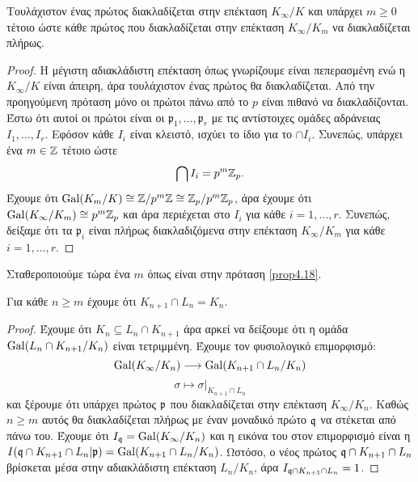 \begin{prop} \label{prop4.18}
    Τουλάχιστον ένας πρώτος διακλαδίζεται στην επέκταση $K_\infty/K$ και υπάρχει $m\geq 0$ τέτοιο ώστε κάθε πρώτος που διακλαδίζεται στην επέκταση $K_\infty/K_m$ να διακλαδίζεται πλήρως.
\end{prop}
\begin{proof}
    Η μέγιστη αδιακλάδιστη επέκταση όπως γνωρίζουμε είναι πεπερασμένη ενώ η $K_\infty/K$ είναι άπειρη, άρα τουλάχιστον ένας πρώτος θα διακλαδίζεται. Από την προηγούμενη πρόταση μόνο οι πρώτοι πάνω από το $p$ είναι πιθανό να διακλαδίζονται. Έστω ότι αυτοί οι πρώτοι είναι οι $\mathfrak{p}_1,\ldots, \mathfrak{p}_r$ με τις αντίστοιχες ομάδες αδράνειας $I_1,\ldots,I_r$. Εφόσον κάθε $I_i$ είναι κλειστό, ισχύει το ίδιο για το $\cap I_i$. Συνεπώς, υπάρχει ένα $m\in \mathbb{Z}$ τέτοιο ώστε 
    $$\bigcap I_i = p^m \mathbb{Z}_p .$$
    Έχουμε ότι $\operatorname{Gal}(K_m/K)\cong \mathbb{Z}/p^m \mathbb{Z} \cong \mathbb{Z}_p/p^m \mathbb{Z}_p$, άρα έχουμε ότι $\operatorname{Gal}(K_\infty/K_m) \cong p^m \mathbb{Z}_p$ και άρα περιέχεται στο $I_i$ για κάθε $i=1,\ldots,r$. Συνεπώς, δείξαμε ότι τα $\mathfrak{p}_i$ είναι πλήρως διακλαδιζόμενα στην επέκταση $K_\infty/K_m$ για κάθε $i=1,\ldots,r$. 
    
\end{proof}

    \noindent Σταθεροποιούμε τώρα ένα $m$ όπως είναι στην πρόταση \ref{prop4.18}.

    \begin{prop}
        Για κάθε $n\geq m$ έχουμε ότι $K_{n+1}\cap L_n = K_n$.
    \end{prop}

    \begin{proof}
                Έχουμε ότι $K_n \subseteq L_n \cap K_{n+1}$ άρα αρκεί να δείξουμε ότι η ομάδα $\operatorname{Gal}(L_n \cap K_{n+1} / K_n)$ είναι τετριμμένη. Έχουμε τον φυσιολογικό επιμορφισμό:
                $$\operatorname{Gal}(K_{\infty}/K_n) \longrightarrow \operatorname{Gal}(K_{n+1}\cap L_n / K_n)$$
                $$\sigma \longmapsto \sigma|_{K_{n+1}\cap L_n}$$
                και ξέρουμε ότι υπάρχει πρώτος $\mathfrak{p}$ που διακλαδίζεται στην επέκταση $K_\infty/K_n$. Καθώς $n\geq m$ αυτός θα διακλαδίζεται πλήρως με έναν μοναδικό πρώτο $\mathfrak{q}$ να στέκεται από πάνω του. Έχουμε ότι $I_{\mathfrak{q}} = \operatorname{Gal}(K_\infty/K_n)$ και η εικόνα του στον επιμορφισμό είναι η $I(\mathfrak{q}\cap K_{n+1}\cap L_n | \mathfrak{p}) = \operatorname{Gal}(K_{n+1}\cap L_n/ K_n)$. Ωστόσο, ο νέος πρώτος $\mathfrak{q}\cap K_{n+1}\cap L_n$ βρίσκεται μέσα στην αδιακλάδιστη επέκταση $L_n/K_n$, άρα $I_{\mathfrak{q} \cap K_{n+1} \cap L_n} = 1$.
    \end{proof}


